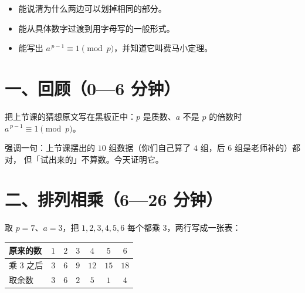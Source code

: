 

\begin{mubiao}
  \begin{itemize}
    \item 能说清为什么两边可以划掉相同的部分。
    \item 能从具体数字过渡到用字母写的一般形式。
    \item 能写出 \(a^{\,p-1}\equiv1\pmod p\)，并知道它叫费马小定理。
  \end{itemize}
\end{mubiao}


\section*{一、回顾（0—6 分钟）}

把上节课的猜想原文写在黑板正中：\(p\) 是质数、\(a\) 不是 \(p\) 的倍数时 \(a^{\,p-1}\equiv1\pmod p\)。

强调一句：上节课摆出的 \(10\) 组数据（你们自己算了 \(4\) 组，后 \(6\) 组是老师补的）都对，
但「试出来的」不算数。今天证明它。

\section*{二、排列相乘（6—26 分钟）}

取 \(p=7\)、\(a=3\)，把 \(1,2,3,4,5,6\) 每个都乘 \(3\)，两行写成一张表：

\begin{center}
\begin{tabular}{@{}lcccccc@{}}
  \toprule
  原来的数 & \(1\) & \(2\) & \(3\) & \(4\) & \(5\) & \(6\) \\
  \midrule
  乘 \(3\) 之后 & \(3\) & \(6\) & \(9\) & \(12\) & \(15\) & \(18\) \\
  取余数 & \(3\) & \(6\) & \(2\) & \(5\) & \(1\) & \(4\) \\
  \bottomrule
\end{tabular}
\end{center}

